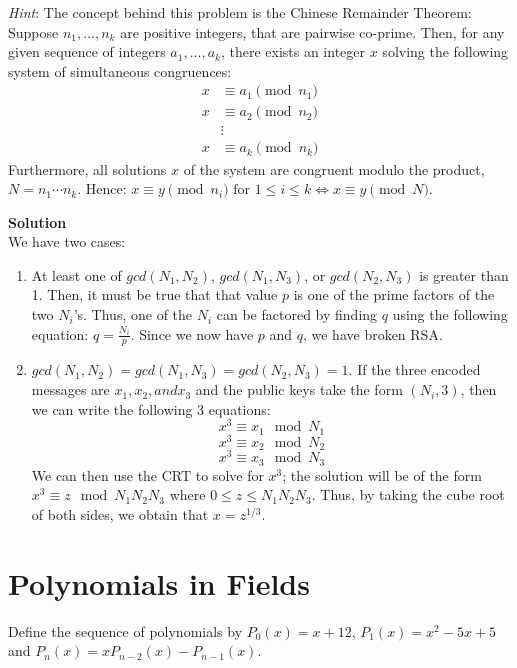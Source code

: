 \documentclass[11pt]{article}
\newcommand*{\Question}[1]{\section{#1}}
\newenvironment{Parts}{\begin{enumerate}[label=(\alph*)]}{\end{enumerate}}
\newenvironment{Answer}{\vspace{10pt}\begin{mdframed}\textbf{Solution}\\}{\end{mdframed}\vfill\pagebreak[3]}
\newenvironment{Answer}{\vspace{10pt}}{\vfill\pagebreak[3]}
\begin{document}
\begin{Parts}
        
    \textit{Hint}: The concept behind this problem is the Chinese Remainder Theorem:
    Suppose $n_1, ...,n_k$ are positive integers, that are pairwise co-prime.
    Then, for any given sequence of integers $a_1, ..., a_k$, there exists an
    integer $x$ solving the following system of simultaneous congruences:
        \begin{align*}
            x &\equiv a_1 \pmod{n_1} \\ 
        x &\equiv a_2 \pmod{n_2} \\ 
        &\vdots \\ 
        x &\equiv a_k \pmod{n_k} 
    \end{align*}
    Furthermore, all solutions $x$ of the system are congruent modulo 
    the product, $N=n_1 \dotsm n_k$. Hence:
        $x \equiv y \pmod{n_i} \text{ for } 1 \leq i \leq k \Leftrightarrow 
      x \equiv y \pmod N $.
  \begin{Answer}
    We have two cases:
    \begin{enumerate}             
        \item At least one of $gcd(N_1,N_2)$, $gcd(N_1, N_3)$, or $gcd(N_2, N_3)$ is greater than 1. Then, it must be true that that value $p$ is one of the prime factors of the two $N_i$'s. Thus, one of the $N_i$ can be factored by finding $q$ using the following equation: $q=\frac{N_i}{p}$. Since we now have $p$ and $q$, we have broken RSA.                                                                                            
        \item  $gcd(N_1,N_2)=gcd(N_1, N_3)=gcd(N_2, N_3)=1$. If the three encoded messages are $x_1, x_2, and x_3$ and the public keys take the form $(N_i, 3)$, then we can write the following 3 equations: $$x^3 \equiv x_1 \mod N_1$$$$x^3 \equiv x_2 \mod N_2$$$$x^3 \equiv x_3 \mod N_3$$ We can then use the CRT to solve for $x^3$; the solution will be of the form $x^3 \equiv z \mod N_1N_2N_3$ where $0 \leq z \leq N_1N_2N_3$. Thus, by taking the cube root of both sides, we obtain that $x=z^{1/3}$.
    \end{enumerate}
  \end{Answer}
\end{Parts}





\Question{Polynomials in Fields}
 Define the sequence of polynomials by $P_0(x) = x+12$, $P_1(x) = x^2 - 5x + 5$ and $P_n(x) = x P_{n-2}(x) - P_{n-1}(x)$.
  
\end{document}
